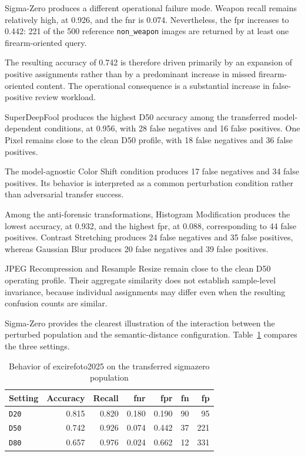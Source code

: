 Sigma-Zero produces a different operational failure mode. Weapon recall remains
relatively high, at 0.926, and the \gls{fnr} is 0.074. Nevertheless, the
\gls{fpr} increases to 0.442: 221 of the 500 reference
\texttt{non\_weapon} images are returned by at least one firearm-oriented
query.

The resulting accuracy of 0.742 is therefore driven primarily by an expansion
of positive assignments rather than by a predominant increase in missed
firearm-oriented content. The operational consequence is a substantial increase
in false-positive review workload.

SuperDeepFool produces the highest D50 accuracy among the transferred
model-dependent conditions, at 0.956, with 28 false negatives and 16 false
positives. One Pixel remains close to the clean D50 profile, with 18 false
negatives and 36 false positives.

The model-agnostic Color Shift condition produces 17 false negatives and 34
false positives. Its behavior is interpreted as a common perturbation condition
rather than adversarial transfer success.

Among the anti-forensic transformations, Histogram Modification produces the
lowest accuracy, at 0.932, and the highest \gls{fpr}, at 0.088,
corresponding to 44 false positives. Contrast Stretching produces 24 false
negatives and 35 false positives, whereas Gaussian Blur produces 20 false
negatives and 39 false positives.

JPEG Recompression and Resample Resize remain close to the clean D50 operating
profile. Their aggregate similarity does not establish sample-level invariance,
because individual assignments may differ even when the resulting confusion
counts are similar.

Sigma-Zero provides the clearest illustration of the interaction between the
perturbed population and the semantic-distance configuration.
Table~\ref{tab:results-excire-sigma-zero} compares the three settings.

\begin{table}[H]
\centering
\caption{Behavior of \gls{excirefoto2025} on the transferred
\gls{sigmazero} population}
\label{tab:results-excire-sigma-zero}
\small
\begin{tabular}{@{}l r r r r r r@{}}
\toprule
\textbf{Setting} &
\textbf{Accuracy} &
\textbf{Recall} &
\textbf{\gls{fnr}} &
\textbf{\gls{fpr}} &
\textbf{\acrshort{fn}} &
\textbf{\acrshort{fp}} \\
\midrule

\texttt{D20}
&
0.815
&
0.820
&
0.180
&
0.190
&
90
&
95 \\

\texttt{D50}
&
0.742
&
0.926
&
0.074
&
0.442
&
37
&
221 \\

\texttt{D80}
&
0.657
&
0.976
&
0.024
&
0.662
&
12
&
331 \\

\bottomrule
\end{tabular}
\end{table}


